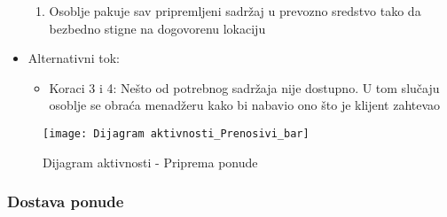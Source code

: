 \documentclass[a4paper]{article}
\begin{document}
\begin{itemize}
\begin{enumerate}
	        \item Osoblje pakuje sav pripremljeni sadržaj u prevozno sredstvo tako da bezbedno stigne na dogovorenu lokaciju
        \end{enumerate}
    \item Alternativni tok:
        \begin{itemize}
            \item Koraci 3 i 4: Nešto od potrebnog sadržaja nije dostupno. U tom slučaju osoblje se obraća menadžeru kako bi nabavio ono što je klijent zahtevao
        \end{itemize}
\end{itemize}

\begin{figure}[H]
    \centering
    \texttt{[image: Dijagram aktivnosti\_Prenosivi\_bar]}
    \caption{Dijagram aktivnosti - Priprema ponude}
    \label{fig:PrenosiviBar}
\end{figure}


\subsubsection{Dostava ponude}
\end{document}
